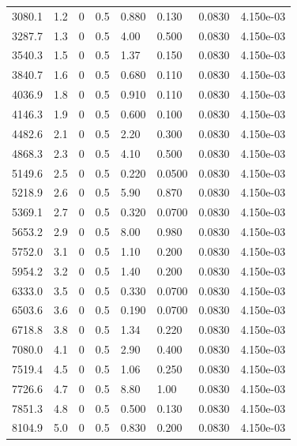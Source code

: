 \documentclass[preview]{standalone}
\begin{document}
{{\begin{tabular}{L{1.2cm}C{1.2cm} C{0.3cm}C{0.5cm} C{1.4cm}C{1.4cm} C{1.4cm}C{1.4cm}}
  3080.1  &   1.2  & 0     & 0.5 &  0.880  & 0.130  & 0.0830 &  4.150e-03   \\ 
  3287.7  &   1.3  & 0     & 0.5 &  4.00  & 0.500  & 0.0830 &  4.150e-03   \\ 
  3540.3  &   1.5  & 0     & 0.5 &  1.37  & 0.150  & 0.0830 &  4.150e-03   \\ 
  3840.7  &   1.6  & 0     & 0.5 &  0.680  & 0.110  & 0.0830 &  4.150e-03   \\ 
  4036.9  &   1.8  & 0     & 0.5 &  0.910  & 0.110  & 0.0830 &  4.150e-03   \\ 
  4146.3  &   1.9  & 0     & 0.5 &  0.600  & 0.100  & 0.0830 &  4.150e-03   \\ 
  4482.6  &   2.1  & 0     & 0.5 &  2.20  & 0.300  & 0.0830 &  4.150e-03   \\ 
  4868.3  &   2.3  & 0     & 0.5 &  4.10  & 0.500  & 0.0830 &  4.150e-03   \\ 
  5149.6  &   2.5  & 0     & 0.5 &  0.220  & 0.0500  & 0.0830 &  4.150e-03   \\ 
  5218.9  &   2.6  & 0     & 0.5 &  5.90  & 0.870  & 0.0830 &  4.150e-03   \\ 
  5369.1  &   2.7  & 0     & 0.5 &  0.320  & 0.0700  & 0.0830 &  4.150e-03   \\ 
  5653.2  &   2.9  & 0     & 0.5 &  8.00  & 0.980  & 0.0830 &  4.150e-03   \\ 
  5752.0  &   3.1  & 0     & 0.5 &  1.10  & 0.200  & 0.0830 &  4.150e-03   \\ 
  5954.2  &   3.2  & 0     & 0.5 &  1.40  & 0.200  & 0.0830 &  4.150e-03   \\ 
  6333.0  &   3.5  & 0     & 0.5 &  0.330  & 0.0700  & 0.0830 &  4.150e-03   \\ 
  6503.6  &   3.6  & 0     & 0.5 &  0.190  & 0.0700  & 0.0830 &  4.150e-03   \\ 
  6718.8  &   3.8  & 0     & 0.5 &  1.34  & 0.220  & 0.0830 &  4.150e-03   \\ 
  7080.0  &   4.1  & 0     & 0.5 &  2.90  & 0.400  & 0.0830 &  4.150e-03   \\ 
  7519.4  &   4.5  & 0     & 0.5 &  1.06  & 0.250  & 0.0830 &  4.150e-03   \\ 
  7726.6  &   4.7  & 0     & 0.5 &  8.80  & 1.00  & 0.0830 &  4.150e-03   \\ 
  7851.3  &   4.8  & 0     & 0.5 &  0.500  & 0.130  & 0.0830 &  4.150e-03   \\ 
  8104.9  &   5.0  & 0     & 0.5 &  0.830  & 0.200  & 0.0830 &  4.150e-03   \\ 

\end{tabular}}}
\end{document}

